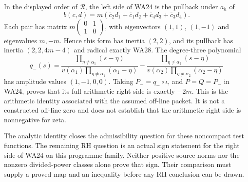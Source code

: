 \documentclass[
  10pt,
  a4paper,
]{article}
\begin{document}
In the displayed order of \(\mathcal R\), the left side of WA24 is the
pullback under \(a_h\) of \[
b(c,d)=m(\bar c_2d_1+\bar c_1d_2+\bar c_4d_3+\bar c_3d_4).
\tag{WA29}
\] Each pair has matrix \(m\begin{pmatrix}0&1\\1&0\end{pmatrix}\), with
eigenvectors \((1,1)\), \((1,-1)\) and eigenvalues \(m,-m\). Hence this
form has inertia \((2,2)\), and its pullback has inertia \((2,2,4m-4)\)
and radical exactly WA28. The degree-three polynomial \[
q_-(s)=\frac{\prod_{\eta\ne\alpha_1}(s-\eta)}
{v(\alpha_1)\prod_{\eta\ne\alpha_1}(\alpha_1-\eta)}
-\frac{\prod_{\eta\ne\alpha_2}(s-\eta)}
{v(\alpha_2)\prod_{\eta\ne\alpha_2}(\alpha_2-\eta)}
\tag{WA30}
\] has amplitude values \((1,-1,0,0)\). Taking \(P_-=q_-\circ\iota\),
and \(P=Q=P_-\) in WA24, proves that its full arithmetic right side is
exactly \(-2m\). This is the arithmetic identity associated with the
assumed off-line packet. It is not a constructed off-line zero and does
not establish that the arithmetic right side is nonnegative for zeta.

The analytic identity closes the admissibility question for these
noncompact test functions. The remaining RH question is an actual sign
statement for the right side of WA24 on this programme family. Neither
positive source norms nor the nonzero divided-power classes alone prove
that sign. Their comparison must supply a proved map and an inequality
before any RH conclusion can be drawn.
\end{document}
